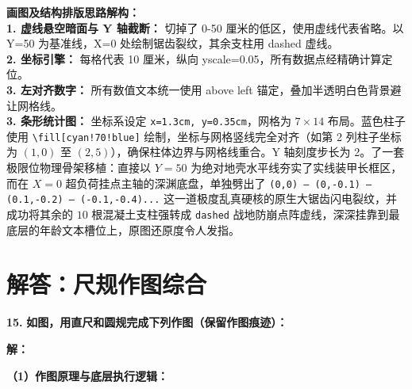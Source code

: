 \documentclass[12pt, a4paper]{ctexrep}
\begin{document}
\vspace{0.4cm}
{\small\color{blue!70!black}
\textbf{画图及结构排版思路解构：}\\
\textbf{1. 虚线悬空暗面与 Y 轴截断：} 切掉了 0-50 厘米的低区，使用虚线代表省略。以 Y=50 为基准线，X=0 处绘制锯齿裂纹，其余支柱用 dashed 虚线。\\
\textbf{2. 坐标引擎：} 每格代表 10 厘米，纵向 yscale=0.05，所有数据点经精确计算定位。\\
\textbf{3. 左对齐数字：} 所有数值文本统一使用 above left 锚定，叠加半透明白色背景避让网格线。\\
\textbf{3. 条形统计图：} 坐标系设定 \texttt{x=1.3cm, y=0.35cm}，网格为 $7\times 14$ 布局。蓝色柱子使用 \texttt{\textbackslash fill[cyan!70!blue]} 绘制，坐标与网格竖线完全对齐（如第 2 列柱子坐标为 $(1,0)$ 至 $(2,5)$），确保柱体边界与网格线重合。Y 轴刻度步长为 2。了一套极限位物理骨架移植：直接以 $Y=50$ 为绝对地壳水平线夯实了实线装甲长框区，而在 $X=0$ 超负荷挂点主轴的深渊底盘，单独劈出了 \texttt{(0,0) -- (0,-0.1) -- (0.1,-0.2) -- (-0.1,-0.4)...} 这一道极度乱真硬核的原生大锯齿闪电裂纹，并成功将其余的 $10$ 根混凝土支柱强转成 \texttt{dashed} 战地防崩点阵虚线，深深挂靠到最底层的年龄文本槽位上，原图还原度令人发指。\\
}
\newpage

\section{解答：尺规作图综合}

\vspace{0.6cm}

\textbf{\LARGE 15.} \textbf{如图，用直尺和圆规完成下列作图（保留作图痕迹）：}

\vspace{0.4cm}

\textbf{解：}

\textbf{（1）作图原理与底层执行逻辑：}
\end{document}

